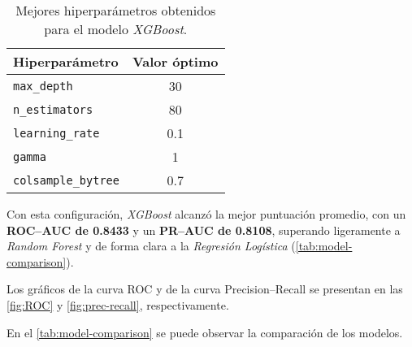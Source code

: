 \documentclass[12pt]{article}
\begin{document}
\begin{table}[H]
\centering
\caption{Mejores hiperparámetros obtenidos para el modelo \textit{XGBoost}.}
\label{tab:xgb-params}
\begin{tabular}{lc}
\toprule
\textbf{Hiperparámetro} & \textbf{Valor óptimo} \\
\midrule
\texttt{max\_depth}        & 30   \\
\texttt{n\_estimators}     & 80   \\
\texttt{learning\_rate}    & 0.1  \\
\texttt{gamma}             & 1    \\
\texttt{colsample\_bytree} & 0.7  \\
\bottomrule
\end{tabular}
\end{table}

Con esta configuración, \textit{XGBoost} alcanzó la mejor puntuación promedio, con un \textbf{ROC–AUC de 0.8433} y un \textbf{PR–AUC de 0.8108}, superando ligeramente a \textit{Random Forest} y de forma clara a la \textit{Regresión Logística} (\autoref{tab:model-comparison}).

Los gráficos de la curva ROC y de la curva Precision–Recall se presentan en las \autoref{fig:ROC} y \autoref{fig:prec-recall}, respectivamente.

En el \autoref{tab:model-comparison} se puede observar la comparación de los modelos.
\end{document}
